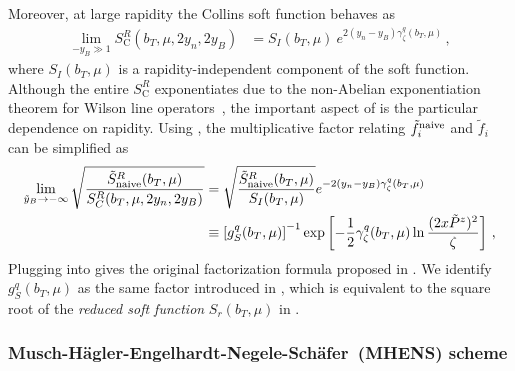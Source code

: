 \documentclass[11pt,a4paper]{article}
\newcommand{\nn}{\nonumber}
\newcommand{\Collins}{\mathrm{C}}
\newcommand{\MHENS}[1][-]{Musch#1H{\"a}gler#1Engelhardt#1Negele#1Sch{\"a}fer}
\begin{document}
Moreover, at large rapidity the Collins soft function behaves as~\cite{Collins:1981uk,Collins:1981va,Collins:1984kg}
\begin{align}\label{eq:exp}
	\lim_{-y_B\gg 1}S^R_{\Collins}(b_T,\mu,2y_n, 2y_B) 
   &= S_I(b_T,\mu)\: e^{2(y_n-y_B)\gamma_\zeta^q(b_T,\mu)}\,,
\end{align}
where $S_I(b_T,\mu)$ is a rapidity-independent component of the soft function. Although the entire $S^R_{\Collins}$ exponentiates due to the non-Abelian exponentiation theorem for Wilson line operators~\cite{Gatheral:1983cz,Frenkel:1984pz}, the important aspect of  is the particular dependence on rapidity.
Using , the multiplicative factor relating $\tilde f^{\rm naive}_i$ and $\tilde f_i$ can be simplified as
\begin{align}\label{eq:softs}
		\lim_{\tilde y_{B}\to -\infty } \sqrt{\frac{\tilde S^R_{\text{naive}}(b_T,\mu)}{S_C^R(b_T,\mu, 2y_n, 2y_B)}}
		& =  \sqrt{\frac{\tilde S^R_{\text{naive}}(b_T,\mu)}{S_I(b_T,\mu)} }e^{-2(y_n-y_B)\gamma_\zeta^q(b_T,\mu)} \nn\\
		& \equiv \left[g_S^q(b_T,\mu)\right]^{-1} \exp\left[-{1\over 2}\gamma_\zeta^q(b_T,\mu) \ln{(2x\tilde P^z)^2 \over \zeta}\right]\,,
	\end{align}
Plugging  into  gives the original factorization formula  proposed in .
We identify $g_S^q(b_T,\mu)$ as the same factor introduced in , which is equivalent to the square root of the \emph{reduced soft function} $S_r(b_T,\mu)$ in .


\subsubsection{\MHENS~(MHENS) scheme}
\label{sec:mhens-scheme}
\end{document}
